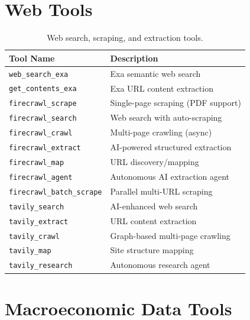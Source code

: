 \section{Web Tools}
\label{sec:tools:web}

\begin{longtable}{p{5cm}p{8cm}}
\caption{Web search, scraping, and extraction tools.} \label{tab:tools-web} \\
\toprule
\textbf{Tool Name} & \textbf{Description} \\
\midrule
\endfirsthead
\texttt{web\_search\_exa} & Exa semantic web search \\
\texttt{get\_contents\_exa} & Exa URL content extraction \\
\texttt{firecrawl\_scrape} & Single-page scraping (PDF support) \\
\texttt{firecrawl\_search} & Web search with auto-scraping \\
\texttt{firecrawl\_crawl} & Multi-page crawling (async) \\
\texttt{firecrawl\_extract} & AI-powered structured extraction \\
\texttt{firecrawl\_map} & URL discovery/mapping \\
\texttt{firecrawl\_agent} & Autonomous AI extraction agent \\
\texttt{firecrawl\_batch\_scrape} & Parallel multi-URL scraping \\
\texttt{tavily\_search} & AI-enhanced web search \\
\texttt{tavily\_extract} & URL content extraction \\
\texttt{tavily\_crawl} & Graph-based multi-page crawling \\
\texttt{tavily\_map} & Site structure mapping \\
\texttt{tavily\_research} & Autonomous research agent \\
\bottomrule
\end{longtable}

\section{Macroeconomic Data Tools}
\label{sec:tools:macro}

